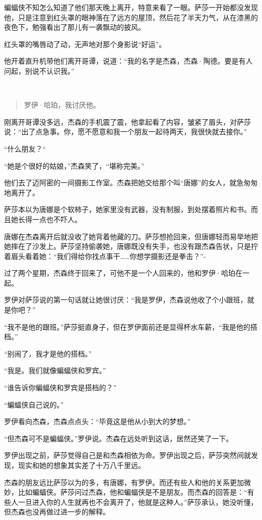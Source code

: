 \documentclass[../main]{subfiles}
\begin{document}
蝙蝠侠不知怎么知道了他们那天晚上离开，特意来看了一眼。萨莎一开始都没发现他，只是注意到红头罩的眼神落在了远方的屋顶，然后花了半天力气，从在漆黑的夜色下，勉强看出了那儿有一袭飘动的披风。

红头罩的嘴唇动了动，无声地对那个身影说“好运”。

他开着直升机带他们离开哥谭，说道：“我的名字是杰森，杰森·陶德。要是有人问起，别说不认识我。”

~\

\begin{quote}
    罗伊·哈珀，我讨厌他。
\end{quote}

刚离开哥谭没多远，杰森的手机震了震，他拿起看了内容，皱紧了眉头，对萨莎说：“出了点急事。你，愿不愿意和我一个朋友一起待两天，我很快就去接你。”

“什么朋友？“

“她是个很好的姑娘，”杰森笑了，“堪称完美。”

他们去了迈阿密的一间摄影工作室。杰森把她交给那个叫“唐娜”的女人，就急匆匆地离开了。

萨莎本以为唐娜是个软柿子，她家里没有武器，没有制服，到处摆着照片和书。而且她长得一点也不吓人。

唐娜在杰森离开后就没收了她背着他藏的刀。萨莎想抢回来，但唐娜轻而易举地把她摔在了沙发上。萨莎坚持偷袭她，唐娜既没有失手，也没有跟杰森告状，只是拧着眉头看着她：“我们得给你找点事干……你想学摄影还是拳击？”-

过了两个星期，杰森终于回来了，可他不是一个人回来的，他和罗伊·哈珀在一起。

罗伊对萨莎说的第一句话就让她很讨厌：“我是罗伊，杰森说他收了个小跟班，就是你吧？”

“我不是他的跟班。”萨莎挺直身子，但在罗伊面前还是显得杯水车薪，“我是他的搭档。”

“别闹了，我才是他的搭档。”

“我是。我们就像蝙蝠侠和罗宾。”

“谁告诉你蝙蝠侠和罗宾是搭档的？”

“蝙蝠侠自己说的。”

罗伊看向杰森，杰森点点头：“毕竟这是他从小到大的梦想。”

“但杰森可不是蝙蝠侠。”罗伊说。杰森在远处听到这话，居然还笑了一下。

罗伊出现之前，萨莎觉得自己是和杰森相依为命。罗伊出现之后，萨莎突然间就发现，现实和她的想象其实差了十万八千里远。

杰森的朋友远比萨莎以为的多，有唐娜，有罗伊。而还有些人和他的关系更加微妙，比如蝙蝠侠。萨莎问过杰森，他和蝙蝠侠是不是朋友。而杰森的回答是：“有些人一旦进入你的人生就再也不会离开了，他就是这种人。”萨莎承认，她没听懂，但杰森也没再做过进一步的解释。
\end{document}
